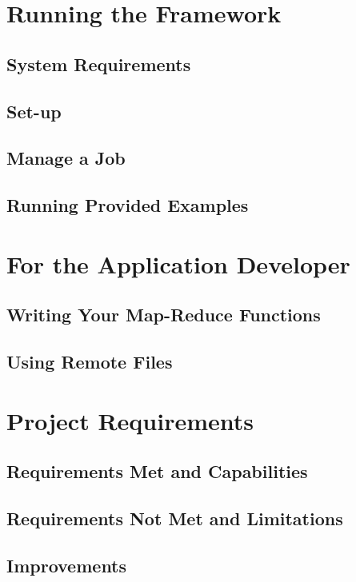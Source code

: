 \documentclass[12pt]{article}
\begin{document}
\maketitle

\pagebreak
\section{Running the Framework}

\subsection{System Requirements}

\subsection{Set-up}

\subsection{Manage a Job}

\subsection{Running Provided Examples}

\section{For the Application Developer}

\subsection{Writing Your Map-Reduce Functions}

\subsection{Using Remote Files}

\section{Project Requirements}

\subsection{Requirements Met and Capabilities}

\subsection{Requirements Not Met and Limitations}

\subsection{Improvements}
\end{document}
